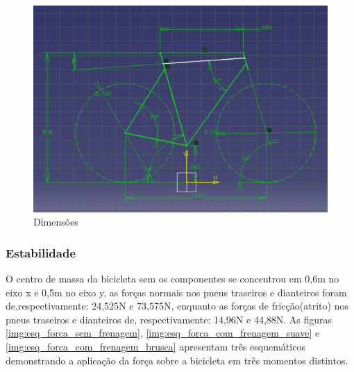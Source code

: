 			\graphicspath{{figuras/}}
			\begin{figure}[h!]
			\centering
			\includegraphics[scale=0.80]{dimensoes.png}
			\caption{Dimensões}
			\label{img:dimensoes}
			\end{figure}

\newpage

	\subsubsection{Estabilidade}
	O centro de massa da bicicleta sem os componentes se concentrou em 0,6m no eixo x e 0,5m no eixo y, as forças normais nos pneus traseiros e dianteiros foram de,respectivamente: 24,525N e 73,575N, enquanto as forças de fricção(atrito)  nos pneus traseiros e dianteiros de, respectivamente: 14,96N e 44,88N. As figuras \ref{img:esq_forca_sem_frenagem}, \ref{img:esq_forca_com_frenagem_suave} e \ref{img:esq_forca_com_frenagem_brusca} apresentam três esquemáticos demonstrando a aplicação da força sobre a bicicleta em três momentos distintos.


